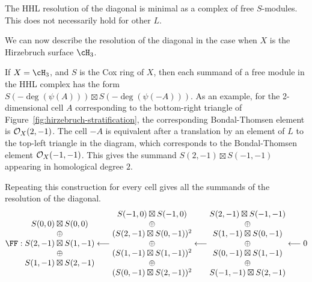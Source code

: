 \documentclass{amsart}
\begin{document}
\begin{remark}
 The HHL resolution of the diagonal is minimal as a complex of free $S$-modules. This does not necessarily hold for other $L$.
\end{remark}


We can now describe the resolution of the diagonal in the case when $X$ is the  Hirzebruch surface $\cH_{3}$. 
\begin{example}
  If $X=\cH_3$, and  $S$ is the Cox ring of $X$, then each summand of a free module in the HHL complex has the form $S(-\deg(\psi(A)))\boxtimes S(-\deg(\psi(-A)))$. As an example, for the 2-dimensional cell $A$ corresponding to the bottom-right triangle of Figure~\ref{fig:hirzebruch-stratification}, the corresponding Bondal-Thomsen element is ${\mathcal O}_X(2,-1)$. The cell $-A$ is equivalent after a translation by an element of $L$ to the top-left triangle in the diagram, which corresponds to the Bondal-Thomsen element ${\mathcal O}_X(-1,-1)$. This gives the summand $S(2,-1)\boxtimes S(-1,-1)$ appearing in homological degree $2$. 

  Repeating this construction for every cell gives all the summands of the resolution of the diagonal.
  \[
   \FF : \begin{matrix}
    S(0,0)\boxtimes S(0,0)\\
    \oplus\\
    S(2,-1)\boxtimes S(1,-1)\\
    \oplus\\
    S(1,-1)\boxtimes S(2,-1)\\
  \end{matrix}\longleftarrow
  \begin{matrix}
    S(-1,0)\boxtimes S(-1,0)\\
    \oplus\\
    (S(2,-1)\boxtimes S(0,-1))^2\\
    \oplus\\
    (S(1,-1)\boxtimes S(1,-1))^2\\
    \oplus\\
    (S(0,-1)\boxtimes S(2,-1))^2\\
  \end{matrix}
  \longleftarrow
  \begin{matrix}
    S(2,-1)\boxtimes S(-1,-1)\\
    \oplus\\
    S(1,-1)\boxtimes S(0,-1)\\
    \oplus\\
    S(0,-1)\boxtimes S(1,-1)\\
    \oplus\\
    S(-1,-1)\boxtimes S(2,-1)\\
  \end{matrix}
  \longleftarrow 0
  \]
\end{example}
\end{document}
